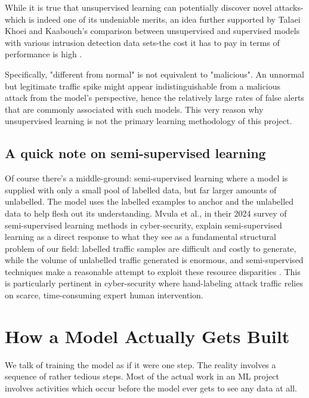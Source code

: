 While it is true that unsupervised learning can potentially discover novel attacks-which is indeed one of its undeniable merits, an idea further supported by Talaei Khoei and Kaabouch's comparison between unsupervised and supervised models with various intrusion detection data sets-the cost it has to pay in terms of performance is high \cite{khoei2023comparative}. 

Specifically, "different from normal" is not equivalent to "malicious". An unnormal but legitimate traffic spike might appear indistinguishable from a malicious attack from the model’s perspective, hence the relatively large rates of false alerts that are commonly associated with such models. This very reason why unsupervised learning is not the primary learning methodology of this project.

\subsection{A quick note on semi-supervised learning}

Of course there's a middle-ground: semi-supervised learning where a model is supplied with only a small pool of labelled data, but far larger amounts of unlabelled. The model uses the labelled examples to anchor and the unlabelled data to help flesh out its understanding. Mvula et al., in their 2024 survey of semi-supervised learning methods in cyber-security, explain semi-supervised learning as a direct response to what they see as a fundamental structural problem of our field: labelled traffic samples are difficult and costly to generate, while the volume of unlabelled traffic generated is enormous, and semi-supervised techniques make a reasonable attempt to exploit these resource disparities \cite{mvula2024semisupervised}. This is particularly pertinent in cyber-security where hand-labeling attack traffic relies on scarce, time-consuming expert human intervention.

\section{How a Model Actually Gets Built}
\label{sec:ml_pipeline}

We talk of training the model as if it were one step. The reality involves a sequence of rather tedious steps. Most of the actual work in an ML project involves activities which occur before the model ever gets to see any data at all.


